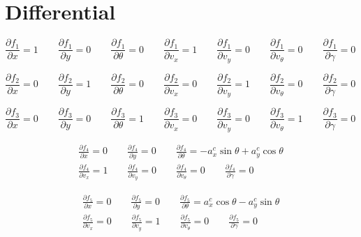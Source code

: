 \documentclass[oneside, 12pt, a4paper]{book}
\begin{document}
\section{Differential}

\begin{equation}
    \frac{\partial f_1}{\partial x} = 1 \qquad
    \frac{\partial f_1}{\partial y} = 0 \qquad
    \frac{\partial f_1}{\partial \theta} = 0 \qquad
    \frac{\partial f_1}{\partial v_x} = 1 \qquad
    \frac{\partial f_1}{\partial v_y} = 0 \qquad
    \frac{\partial f_1}{\partial v_\theta} = 0 \qquad
    \frac{\partial f_1}{\partial \gamma} = 0 \qquad
\end{equation}

\begin{equation}
    \frac{\partial f_2}{\partial x} = 0 \qquad
    \frac{\partial f_2}{\partial y} = 1 \qquad
    \frac{\partial f_2}{\partial \theta} = 0 \qquad
    \frac{\partial f_2}{\partial v_x} = 0 \qquad
    \frac{\partial f_2}{\partial v_y} = 1 \qquad
    \frac{\partial f_2}{\partial v_\theta} = 0 \qquad
    \frac{\partial f_2}{\partial \gamma} = 0 \qquad
\end{equation}

\begin{equation}
    \frac{\partial f_3}{\partial x} = 0 \qquad
    \frac{\partial f_3}{\partial y} = 0 \qquad
    \frac{\partial f_3}{\partial \theta} = 1 \qquad
    \frac{\partial f_3}{\partial v_x} = 0 \qquad
    \frac{\partial f_3}{\partial v_y} = 0 \qquad
    \frac{\partial f_3}{\partial v_\theta} = 1 \qquad
    \frac{\partial f_3}{\partial \gamma} = 0 \qquad
\end{equation}

\begin{equation}
    \begin{split}
    \frac{\partial f_4}{\partial x} = 0 \qquad
    \frac{\partial f_4}{\partial y} = 0 \qquad
    \frac{\partial f_4}{\partial \theta} = -a^c_x\sin{\theta} + a^c_y\cos{\theta}\\
    \frac{\partial f_4}{\partial v_x} = 1 \qquad
    \frac{\partial f_4}{\partial v_y} = 0 \qquad
    \frac{\partial f_4}{\partial v_\theta} = 0 \qquad
    \frac{\partial f_4}{\partial \gamma} = 0 \qquad
\end{split}
\end{equation}

\begin{equation}
    \begin{split}
        \frac{\partial f_5}{\partial x} = 0 \qquad
        \frac{\partial f_5}{\partial y} = 0 \qquad
        \frac{\partial f_5}{\partial \theta} = a^c_x\cos{\theta} - a^c_y\sin{\theta}\\
        \frac{\partial f_5}{\partial v_x} = 0 \qquad
        \frac{\partial f_5}{\partial v_y} = 1 \qquad
        \frac{\partial f_5}{\partial v_\theta} = 0 \qquad
        \frac{\partial f_5}{\partial \gamma} = 0 \qquad
    \end{split}
\end{equation}
\end{document}
